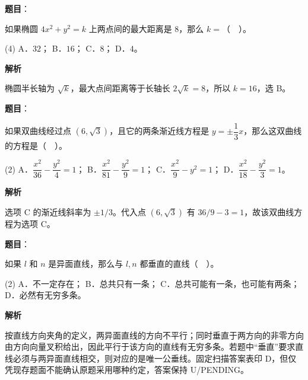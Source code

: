 \begin{answer}

\textbf{题目}：

如果椭圆 $4x^2+y^2=k$ 上两点间的最大距离是 $8$，那么 $k=$（　）。

\begin{gkopts}(4)
\task A．$32$；
\task B．$16$；
\task C．$8$；
\task D．$4$。
\end{gkopts}

\textbf{解析}

椭圆半长轴为 $\sqrt{k}$，最大点间距离等于长轴长 $2\sqrt{k}=8$，所以 $k=16$，选 B。


\end{answer}
\begin{answer}

\textbf{题目}：

如果双曲线经过点 $(6,\sqrt3)$，且它的两条渐近线方程是 $y=\pm\dfrac13x$，那么这双曲线的方程是（　）。

\begin{gkopts}(2)
\task A．$\dfrac{x^2}{36}-\dfrac{y^2}{4}=1$；
\task B．$\dfrac{x^2}{81}-\dfrac{y^2}{9}=1$；
\task C．$\dfrac{x^2}{9}-y^2=1$；
\task D．$\dfrac{x^2}{18}-\dfrac{y^2}{3}=1$。
\end{gkopts}

\textbf{解析}

选项 C 的渐近线斜率为 $\pm1/3$。代入点 $(6,\sqrt3)$ 有 $36/9-3=1$，故该双曲线方程为选项 C。


\end{answer}
\begin{answer}

\textbf{题目}：

如果 $l$ 和 $n$ 是异面直线，那么与 $l,n$ 都垂直的直线（　）。

\begin{gkopts}(2)
\task A．不一定存在；
\task B．总共只有一条；
\task C．总共可能有一条，也可能有两条；
\task D．必然有无穷多条。
\end{gkopts}

\textbf{解析}

按直线方向夹角的定义，两异面直线的方向不平行；同时垂直于两方向的非零方向由方向向量叉积给出，因此平行于该方向的直线有无穷多条。若题中“垂直”要求直线必须与两异面直线相交，则对应的是唯一公垂线。固定扫描答案表印 D，但仅凭现存题面不能确认原题采用哪种约定，答案保持 U/PENDING。


\end{answer}

